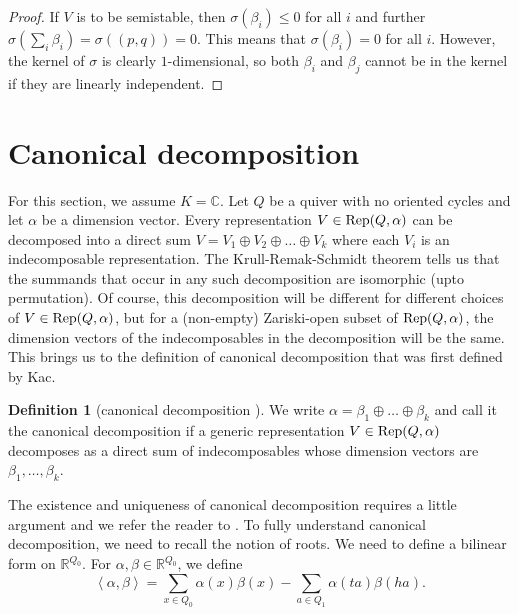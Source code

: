 \documentclass[11pt]{amsart}
\theoremstyle{definition}
\newtheorem{definition}[theorem]{Definition}
\newcommand{\R}{{\mathbb R}}
\newcommand{\Rep}{{\rm Rep}}
\newcommand{\C}{{\mathbb C}}
\begin{document}
\begin{proof}
If $V$ is to be semistable, then $\sigma(\beta_i) \leq 0$ for all $i$ and further $\sigma(\sum_i \beta_i)  = \sigma((p,q))= 0$. This means that $\sigma(\beta_i) = 0$ for all $i$. However, the kernel of $\sigma$ is clearly $1$-dimensional, so both $\beta_i$ and $\beta_j$ cannot be in the kernel if they are linearly independent.
\end{proof}



















\section{Canonical decomposition} \label{sec:can.dec}
For this section, we assume $K = \C$. Let $Q$ be a quiver with no oriented cycles and let $\alpha$ be a dimension vector. Every representation $V \in \Rep(Q,\alpha)$ can be decomposed into a direct sum $V = V_1 \oplus V_2 \oplus \dots \oplus V_k$ where each $V_i$ is an indecomposable representation. The Krull-Remak-Schmidt theorem tells us that the summands that occur in any such decomposition are isomorphic (upto permutation). Of course, this decomposition will be different for different choices of $V \in \Rep(Q,\alpha)$, but for a (non-empty) Zariski-open subset of $\Rep(Q,\alpha)$, the dimension vectors of the indecomposables in the decomposition will be the same. This brings us to the definition of canonical decomposition that was first defined by Kac.

\begin{definition} [canonical decomposition \cite{Kac,Kac2}]
We write $\alpha = \beta_1 \oplus \dots \oplus \beta_k$ and call it the canonical decomposition if a generic representation $V \in \Rep(Q,\alpha)$ decomposes as a direct sum of indecomposables whose dimension vectors are $\beta_1,\dots,\beta_k$. 
\end{definition}

The existence and uniqueness of canonical decomposition requires a little argument and we refer the reader to \cite{DW-book}. To fully understand canonical decomposition, we need to recall the notion of roots. We need to define a bilinear form on $\R^{Q_0}$. For $\alpha,\beta \in \R^{Q_0}$, we define 
$$
\left< \alpha,\beta \right> = \sum_{x \in Q_0} \alpha(x)\beta(x) - \sum_{a \in Q_1} \alpha(ta)\beta(ha).
$$
\end{document}
